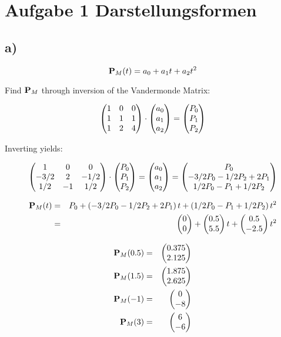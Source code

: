 
\section*{Aufgabe 1 Darstellungsformen}

\subsection*{a)}


\begin{equation}
    {\bf P}_M(t) = a_0 + a_1 t + a_2 t^2
\end{equation}

Find ${\bf P}_M$ through inversion of the Vandermonde Matrix:

\begin{equation}
    \left( \begin{matrix}1 & 0 & 0 \\ 1 & 1 & 1 \\ 1 & 2 & 4\end{matrix}\right) \cdot \left( \begin{matrix}a_0 \\ a_1 \\ a_2\end{matrix}\right) = \left( \begin{matrix}P_0 \\ P_1 \\ P_2\end{matrix}\right)
\end{equation}

Inverting yields:

\begin{equation}
    \left( \begin{matrix}1 & 0 & 0 \\ -3/2 & 2  & -1/2  \\ 1/2 & -1 & 1/2\end{matrix}\right) \cdot \left( \begin{matrix}P_0 \\ P_1 \\ P_2\end{matrix}\right) = \left( \begin{matrix}a_0 \\ a_1 \\ a_2\end{matrix}\right) 
    = \left( \begin{matrix}P_0 \\ -3/2 P_0 - 1/2 P_2 + 2 P_1 \\ 1/2 P_0 - P_1 + 1/2 P_2\end{matrix}\right)
\end{equation}


\begin{eqnarray}
     {\bf P}_M(t) &=&  P_0  + \left( -3/2 P_0 - 1/2 P_2 + 2 P_1 \right) t + \left( 1/2 P_0 - P_1 + 1/2 P_2 \right) t^2 \\
&=& \left( \begin{matrix}0 \\0\end{matrix}\right) + \left( \begin{matrix}0.5 \\ 5.5 \end{matrix}\right) t   + \left( \begin{matrix}0.5 \\ - 2.5 \end{matrix}\right) t^2 
\end{eqnarray}

\begin{eqnarray}
    {\bf P}_M(0.5) &=& \left( \begin{matrix}0.375 \\ 2.125\end{matrix}\right) \\
    {\bf P}_M(1.5) &=& \left( \begin{matrix}1.875 \\ 2.625\end{matrix}\right) \\
    {\bf P}_M(-1) &=& \left( \begin{matrix}0 \\ -8\end{matrix}\right) \\
    {\bf P}_M(3) &=& \left( \begin{matrix}6 \\ -6\end{matrix}\right) 
\end{eqnarray}


